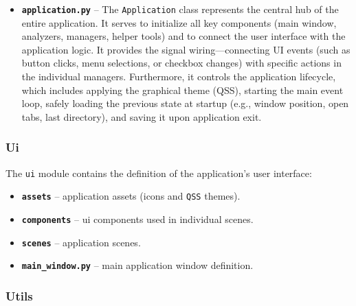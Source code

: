 \documentclass[12pt, a4paper]{article}
\begin{document}
\begin{itemize}
    \item \textbf{\texttt{application.py}} -- The \texttt{Application} class represents 
    the central hub of the entire application. It serves to initialize all key components 
    (main window, analyzers, managers, helper tools) and to connect the user interface with 
    the application logic. It provides the signal wiring—connecting UI events (such as button 
    clicks, menu selections, or checkbox changes) with specific actions in the individual managers. 
    Furthermore, it controls the application lifecycle, which includes applying the graphical theme (QSS), 
    starting the main event loop, safely loading the previous state at startup (e.g., window position, 
    open tabs, last directory), and saving it upon application exit.
\end{itemize}

\subsubsection{Ui}

The \texttt{ui} module contains the definition of the application's user interface:

\begin{itemize}
    \item \textbf{\texttt{assets}} -- application assets (icons and \texttt{QSS} themes).
    \item \textbf{\texttt{components}} -- ui components used in individual scenes.
    \item \textbf{\texttt{scenes}} -- application scenes.
    \item \textbf{\texttt{main\_window.py}} -- main application window definition.
\end{itemize}

\subsubsection{Utils}
\end{document}
